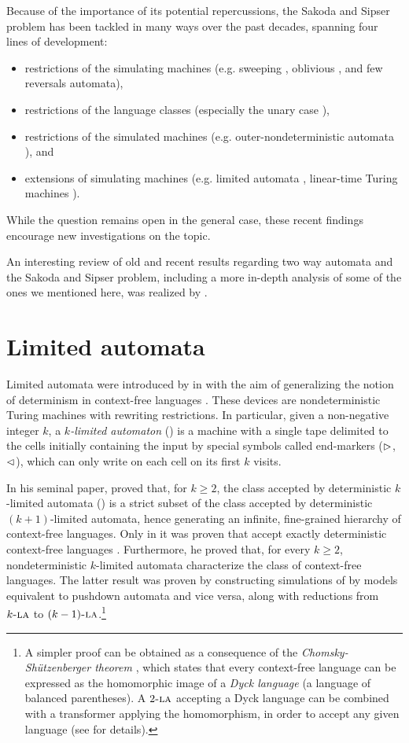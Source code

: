 Because of the importance of its potential repercussions, the Sakoda and Sipser problem has been tackled in many ways over the past decades, spanning four lines of development:
\begin{itemize}
	\item restrictions of the simulating machines (e.g. sweeping \cite{Sip80}, oblivious \cite{HroSch03}, and few reversals \cite{Kap13} automata),
	\item restrictions of the language classes (especially the unary case \cite{GefMer+07}),
	\item restrictions of the simulated machines (e.g. outer-nondeterministic automata \cite{GefGui+14,KapPig12}), and
	\item extensions of simulating machines (e.g. limited automata \cite{PigPis14,PigPri19,GuiPri19,PigPri+22}, linear-time Turing machines \cite{Pru14,GuiPig+18,Hen65,GuiPig+23,Har68}).
\end{itemize}
While the question remains open in the general case, these recent findings encourage new investigations on the topic.

An interesting review of old and recent results regarding two way automata and the Sakoda and Sipser problem, including a more in-depth analysis of some of the ones we mentioned here, was realized by .


\section{Limited automata}
Limited automata were introduced by  in \citeyear{Hib67} with the aim of generalizing the notion of determinism in context-free languages \cite{Hib67}.
These devices are nondeterministic Turing machines with rewriting restrictions.
In particular, given a non-negative integer $k$, a \emph{$k$-limited automaton} (\kLA) is a machine with a single tape delimited to the cells initially containing the input by special symbols called end-markers ($\rhd$,$\lhd$), which can only write on each cell on its first $k$ visits.

In his seminal paper, \citeauthor{Hib67} proved that, for $k\ge2$, the class accepted by deterministic $k$-limited automata (\kDLA) is a strict subset of the class accepted by deterministic $(k+1)$-limited automata, hence generating an infinite, fine-grained hierarchy of context-free languages.
Only in \citeyear{PigPis15} it was proven that  accept exactly deterministic context-free languages \cite{PigPis15}.
Furthermore, he proved that, for every $k\ge2$, nondeterministic $k$-limited automata characterize the class of context-free languages.
The latter result was proven by constructing simulations of  by models equivalent to pushdown automata and vice versa, along with reductions from $k\textsc{-la}$ to $(k-1)\textsc{-la}$.\footnote{%
	A simpler proof can be obtained as a consequence of the \emph{Chomsky-Shützenberger theorem} \cite{ChoSch63}, which states that every context-free language can be expressed as the homomorphic image of a \emph{Dyck language} (a language of balanced parentheses).
	A $2\textsc{-la}$ accepting a Dyck language can be combined with a transformer applying the homomorphism, in order to accept any given language (see \cite{Pig19} for details).}

